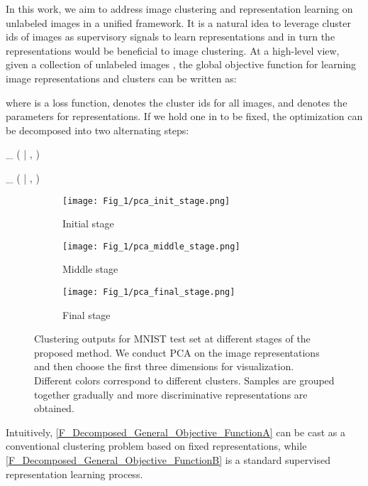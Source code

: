 \documentclass[10pt,twocolumn,letterpaper]{article}
\DeclareMathOperator*{\argmin}{argmin}
\begin{document}
In this work, we aim to {address} image clustering and representation learning on unlabeled images in a {unified} framework. {It is a natural idea to leverage cluster ids of images as supervisory signals to learn representations and in turn the representations would be beneficial to image clustering.} At a high-level view, given a collection of  unlabeled images , the global objective function {for learning image representations and clusters} can be written as:

where  is a loss function,  denotes the cluster ids for all images, and  denotes the parameters for representations. If we hold one in  to be fixed, the optimization can be decomposed into two alternating steps:

\argmin_{} ( | , \bm{\theta})
\label{F_Decomposed_General_Objective_FunctionA}

\argmin_{\bm{\theta}} (\bm{\theta} | , )
\label{F_Decomposed_General_Objective_FunctionB}


\begin{figure}[t]
   \begin{subfigure}{0.32\linewidth}
   \centering
    \texttt{[image: Fig\_1/pca\_init\_stage.png]}
    \vspace{-5pt}
    \caption{Initial stage}
   \end{subfigure}
   \begin{subfigure}{0.32\linewidth}
   \centering
    \texttt{[image: Fig\_1/pca\_middle\_stage.png]}
    \vspace{-5pt}
    \caption{Middle stage}
   \end{subfigure}
   \begin{subfigure}{0.32\linewidth}
   \centering
       \texttt{[image: Fig\_1/pca\_final\_stage.png]}
   \vspace{-5pt}
   \caption{Final stage}
   \end{subfigure}
   \vspace{-5pt}
   \caption{{Clustering outputs for MNIST \cite{lecun1998gradient} test set at different stages of the proposed method. We conduct PCA on the {image} representations and then choose the first three dimensions for {visualization}. Different colors correspond to different clusters. Samples are grouped together gradually and more discriminative representations are obtained.}}
   \label{Fig_Introduction}
\end{figure}
{Intuitively}, \eqref{F_Decomposed_General_Objective_FunctionA} can be cast as a {conventional} clustering problem based on fixed representations, while \eqref{F_Decomposed_General_Objective_FunctionB} is a standard supervised representation learning process. 
\end{document}
